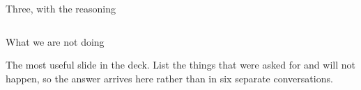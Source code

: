 
\begin{frame}{Three, with the reasoning}
  \begin{columns}[T]
  \end{columns}
\end{frame}

\begin{frame}{What we are not doing}
  \begin{glass}
  The most useful slide in the deck. List the things that were asked for and will not happen,
  so the answer arrives here rather than in six separate conversations.
  \end{glass}
\end{frame}
